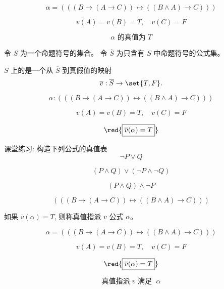 \begin{frame}{}
  \[
    \alpha = (((B \to (A \to C)) \leftrightarrow ((B \land A) \to C)))
  \]

  \[
    v(A) = v(B) = T, \quad v(C) = F
  \]

  \pause
  \vspace{0.30cm}
  \[
    \alpha \text{ 的真值为}\; T
  \]
\end{frame}

\begin{frame}{}
  \begin{definition}
    令 $S$ 为一个命题符号的集合。
    令 $\overline{S}$ 为只含有 $S$ 中命题符号的公式集。

    $S$ 上的是一个从 $\overline{S}$ 到真假值的映射
    \[
      \overline{v}: \overline{S} \to \set{T, F}.
    \]
  \end{definition}

  \pause
  \[
    \alpha: (((B \to (A \to C)) \leftrightarrow ((B \land A) \to C)))
  \]

  \[
    v(A) = v(B) = T, \quad v(C) = F
  \]

  \pause
  \[
    \red{\boxed{\overline{v}(\alpha) = T}}
  \]
\end{frame}

\begin{frame}{}
  \begin{exampleblock}{课堂练习: 构造下列公式的真值表}
    \[
      \lnot P \lor Q
    \]

    \[
      (P \land Q) \lor (\lnot P \land \lnot Q)
    \]

    \[
      (P \land Q) \land \lnot P
    \]

    \[
      (((B \to (A \to C)) \leftrightarrow ((B \land A) \to C)))
    \]
  \end{exampleblock}
\end{frame}

\begin{frame}{}
  \begin{definition}[满足 (Satisfy)]
    如果 $\overline{v}(\alpha) = T$, 则称真值指派 $v$ 公式 $\alpha$。
  \end{definition}

  \pause
  \[
    \alpha = (((B \to (A \to C)) \leftrightarrow ((B \land A) \to C)))
  \]

  \[
    v(A) = v(B) = T, \quad v(C) = F
  \]

  \[
    \red{\boxed{\overline{v}(\alpha) = T}}
  \]

  \[
    \text{真值指派}\; v \text{ 满足 }\; \alpha
  \]
\end{frame}

